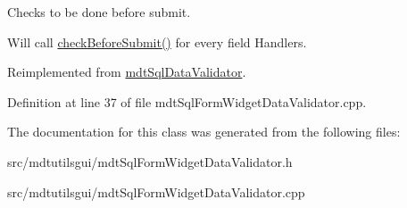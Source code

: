 Checks to be done before submit. 

Will call \hyperlink{classmdt_sql_form_widget_data_validator_aa577e4acf4d0f371c45a67c18c59a924}{checkBeforeSubmit()} for every field Handlers. 

Reimplemented from \hyperlink{classmdt_sql_data_validator_af291c18e9c8994085ed4664db3fdcb7c}{mdtSqlDataValidator}.



Definition at line 37 of file mdtSqlFormWidgetDataValidator.cpp.



The documentation for this class was generated from the following files:\begin{DoxyCompactItemize}
\item 
src/mdtutilsgui/mdtSqlFormWidgetDataValidator.h\item 
src/mdtutilsgui/mdtSqlFormWidgetDataValidator.cpp\end{DoxyCompactItemize}
